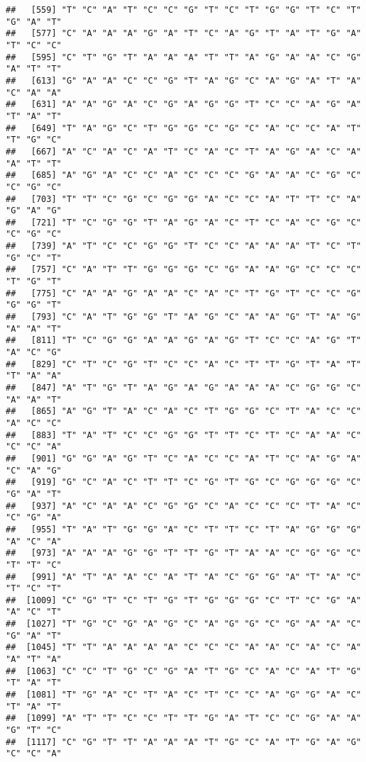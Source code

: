 \documentclass[
]{article}
\begin{document}
\begin{verbatim}
##   [559] "T" "C" "A" "T" "C" "C" "G" "T" "C" "T" "G" "G" "T" "C" "T" "G" "A" "T"
##   [577] "C" "A" "A" "A" "G" "A" "T" "C" "A" "G" "T" "A" "T" "G" "A" "T" "C" "C"
##   [595] "C" "T" "G" "T" "A" "A" "A" "T" "T" "A" "G" "A" "A" "C" "G" "A" "T" "T"
##   [613] "G" "A" "A" "C" "C" "G" "T" "A" "G" "C" "A" "G" "A" "T" "A" "C" "A" "A"
##   [631] "A" "A" "G" "A" "C" "G" "A" "G" "G" "T" "C" "C" "A" "G" "A" "T" "A" "T"
##   [649] "T" "A" "G" "C" "T" "G" "G" "C" "G" "C" "A" "C" "C" "A" "T" "T" "G" "C"
##   [667] "A" "C" "A" "C" "A" "T" "C" "A" "C" "T" "A" "G" "A" "C" "A" "A" "T" "T"
##   [685] "A" "G" "A" "C" "C" "A" "C" "C" "C" "G" "A" "A" "C" "G" "C" "C" "G" "C"
##   [703] "T" "T" "C" "G" "C" "G" "G" "A" "C" "C" "A" "T" "T" "C" "A" "G" "A" "G"
##   [721] "T" "C" "G" "G" "T" "A" "G" "A" "C" "T" "C" "A" "C" "G" "C" "C" "G" "C"
##   [739] "A" "T" "C" "C" "G" "G" "T" "C" "C" "A" "A" "A" "T" "C" "T" "G" "C" "T"
##   [757] "C" "A" "T" "T" "G" "G" "G" "C" "G" "A" "A" "G" "C" "C" "C" "T" "G" "T"
##   [775] "C" "A" "A" "G" "A" "A" "C" "A" "C" "T" "G" "T" "C" "C" "G" "G" "G" "T"
##   [793] "C" "A" "T" "G" "G" "T" "A" "G" "C" "A" "A" "G" "T" "A" "G" "A" "A" "T"
##   [811] "T" "C" "G" "G" "A" "A" "G" "A" "G" "T" "C" "C" "A" "G" "T" "A" "C" "G"
##   [829] "C" "T" "C" "G" "T" "C" "C" "A" "C" "T" "T" "G" "T" "A" "T" "T" "A" "A"
##   [847] "A" "T" "G" "T" "A" "G" "A" "G" "A" "A" "A" "C" "G" "G" "C" "A" "A" "T"
##   [865] "A" "G" "T" "A" "C" "A" "C" "T" "G" "G" "C" "T" "A" "C" "C" "A" "C" "C"
##   [883] "T" "A" "T" "C" "C" "G" "G" "T" "T" "C" "T" "C" "A" "A" "C" "C" "C" "A"
##   [901] "G" "G" "A" "G" "T" "C" "A" "C" "C" "A" "T" "C" "A" "G" "A" "C" "A" "G"
##   [919] "G" "C" "A" "C" "T" "T" "C" "G" "T" "G" "C" "G" "G" "G" "C" "G" "A" "T"
##   [937] "A" "C" "A" "A" "C" "G" "G" "C" "A" "C" "C" "C" "T" "A" "C" "C" "G" "A"
##   [955] "T" "A" "T" "G" "G" "A" "C" "T" "T" "C" "T" "A" "G" "G" "G" "A" "C" "A"
##   [973] "A" "A" "A" "G" "G" "T" "T" "G" "T" "A" "A" "C" "G" "G" "C" "T" "T" "C"
##   [991] "A" "T" "A" "A" "C" "A" "T" "A" "C" "G" "G" "A" "T" "A" "C" "T" "C" "T"
##  [1009] "C" "G" "T" "C" "T" "G" "T" "G" "G" "G" "C" "T" "C" "G" "A" "A" "C" "T"
##  [1027] "T" "G" "C" "G" "A" "G" "C" "A" "G" "G" "C" "G" "A" "A" "C" "G" "A" "T"
##  [1045] "T" "T" "A" "A" "A" "A" "C" "C" "C" "A" "A" "C" "A" "C" "A" "A" "T" "A"
##  [1063] "C" "C" "T" "G" "C" "G" "A" "T" "G" "C" "A" "C" "A" "T" "G" "T" "A" "T"
##  [1081] "T" "G" "A" "C" "T" "A" "C" "T" "C" "C" "A" "G" "G" "A" "C" "T" "A" "T"
##  [1099] "A" "T" "T" "C" "C" "T" "T" "G" "A" "T" "C" "C" "G" "A" "A" "G" "T" "C"
##  [1117] "C" "G" "T" "T" "A" "A" "A" "T" "G" "C" "A" "T" "G" "A" "G" "C" "C" "A"

\end{verbatim}
\end{document}
